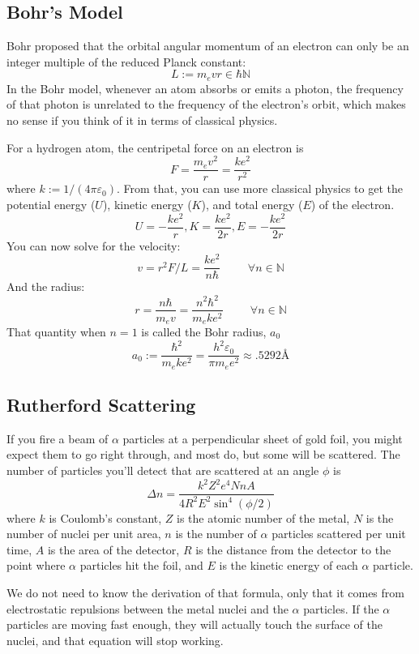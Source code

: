 \documentclass[12pt]{article}
\begin{document}
\subsection{Bohr's Model}
Bohr proposed that the orbital angular momentum of an electron can only be an integer multiple of the reduced Planck constant:
\[ L := m_e v r \in \hbar \mathbb{N} \]
In the Bohr model, whenever an atom absorbs or emits a photon, the frequency of that photon is unrelated to the frequency of the electron's orbit, which makes no sense if you think of it in terms of classical physics.

For a hydrogen atom, the centripetal force on an electron is
\[ F = \frac{m_e v^2}{r} = \frac{ke^2}{r^2} \]
where $k := 1 / (4 \pi \varepsilon_0)$. From that, you can use more classical physics to get the potential energy ($U$), kinetic energy ($K$), and total energy ($E$) of the electron.
\[ U =  - \frac{k e^2}{r} , K = \frac{k e^2}{2 r} , E = - \frac{k e^2}{2 r} \]
You can now solve for the velocity:
\[ v = r^2 F / L = \frac{k e^2}{n \hbar} \hspace{1cm} \forall n \in \mathbb{N}\]
And the radius:
\[ r = \frac{n \hbar}{m_e v} = \frac{n^2 \hbar^2}{m_e k e^2} \hspace{1cm} \forall n \in \mathbb{N} \]
That quantity when $n=1$ is called the Bohr radius, $a_0$
\[ a_0 := \frac{\hbar^2}{m_e k e^2} = \frac{h^2 \varepsilon_0}{\pi m_e e^2} \approx .5292 \text{\AA} \]

\subsection{Rutherford Scattering}
If you fire a beam of $\alpha$ particles at a perpendicular sheet of gold foil, you might expect them to go right through, and most do, but some will be scattered. The number of particles you'll detect that are scattered at an angle $\phi$ is
\[ \Delta n = \frac{k^2 Z^2 e^4 N n A}{4 R^2 E^2 \sin^4 (\phi / 2)} \]
where $k$ is Coulomb's constant, $Z$ is the atomic number of the metal, $N$ is the number of nuclei per unit area, $n$ is the number of $\alpha$ particles scattered per unit time, $A$ is the area of the detector, $R$ is the distance from the detector to the point where $\alpha$ particles hit the foil, and $E$ is the kinetic energy of each $\alpha$ particle.

We do not need to know the derivation of that formula, only that it comes from electrostatic repulsions between the metal nuclei and the $\alpha$ particles. If the $\alpha$ particles are moving fast enough, they will actually touch the surface of the nuclei, and that equation will stop working.
\end{document}
